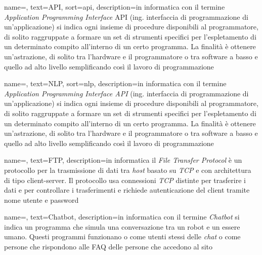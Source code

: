 
\renewcommand{\acronymname}{Acronimi e abbreviazioni}

{
    name=,
    text=API,
    sort=api,
    description={in informatica con il termine \emph{Application Programming
Interface} API (ing. interfaccia di programmazione di un’applicazione) si
indica ogni insieme di procedure disponibili al programmatore, di solito raggruppate
a formare un set di strumenti specifici per l’espletamento di un determinato
compito all’interno di un certo programma. La finalità è ottenere un’astrazione,
di solito tra l’hardware e il programmatore o tra software a basso e quello ad alto
livello semplificando così il lavoro di programmazione}
}

{
    name=,
    text=NLP,
    sort=nlp,
    description={in informatica con il termine \emph{Application Programming Interface API} (ing. interfaccia di programmazione di un'applicazione) si indica ogni insieme di procedure disponibili al programmatore, di solito raggruppate a formare un set di strumenti specifici per l'espletamento di un determinato compito all'interno di un certo programma. La finalità è ottenere un'astrazione, di solito tra l'hardware e il programmatore o tra software a basso e quello ad alto livello semplificando così il lavoro di programmazione}
}

{
    name=,
    text=FTP,
    description={in informatica il \emph{File Transfer Protocol} è un protocollo per la trasmissione di dati tra \emph{host} basato su \emph{TCP} e con architettura di tipo client-server. Il protocollo usa connessioni \emph{TCP} distinte per trasferire i dati e per controllare i trasferimenti e richiede autenticazione del client tramite nome utente e password}
}

{
    name=,
    text=Chatbot,
    description={in informatica con il termine \emph{Chatbot} si indica un programma che simula una conversazione tra un robot e un essere umano. Questi programmi funzionano o come utenti stessi delle \emph{chat} o come persone che rispondono alle FAQ delle persone che accedono al sito}
}

